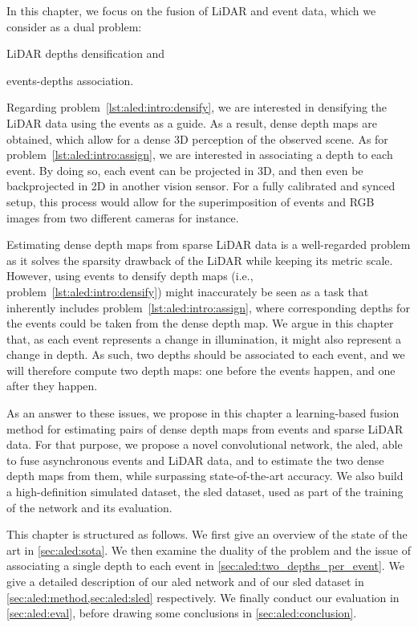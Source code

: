 In this chapter, we focus on the fusion of LiDAR and event data, which we consider as a dual problem:
\begin{enumerate*}[label=\textbf{(\arabic*)}]
  \item LiDAR depths densification and\label{lst:aled:intro:densify}
  \item events-depths association.\label{lst:aled:intro:assign}
\end{enumerate*}
Regarding problem~\ref{lst:aled:intro:densify}, we are interested in densifying the LiDAR data using the events as a guide. As a result, dense depth maps are obtained, which allow for a dense 3D perception of the observed scene. As for problem~\ref{lst:aled:intro:assign}, we are interested in associating a depth to each event. By doing so, each event can be projected in 3D, and then even be backprojected in 2D in another vision sensor. For a fully calibrated and synced setup, this process would allow for the superimposition of events and RGB images from two different cameras for instance.

Estimating dense depth maps from sparse LiDAR data is a well-regarded problem as it solves the sparsity drawback of the LiDAR while keeping its metric scale. However, using events to densify depth maps (i.e., problem~\ref{lst:aled:intro:densify}) might inaccurately be seen as a task that inherently includes problem~\ref{lst:aled:intro:assign}, where corresponding depths for the events could be taken from the dense depth map. We argue in this chapter that, as each event represents a change in illumination, it might also represent a change in depth. As such, two depths should be associated to each event, and we will therefore compute two depth maps: one before the events happen, and one after they happen.

As an answer to these issues, we propose in this chapter a learning-based fusion method for estimating pairs of dense depth maps from events and sparse LiDAR data. For that purpose, we propose a novel convolutional network, the \acrfull{aled}, able to fuse asynchronous events and LiDAR data, and to estimate the two dense depth maps from them, while surpassing state-of-the-art accuracy. We also build a high-definition simulated dataset, the \acrfull{sled} dataset, used as part of the training of the network and its evaluation.

This chapter is structured as follows. We first give an overview of the state of the art in \cref{sec:aled:sota}. We then examine the duality of the problem and the issue of associating a single depth to each event in \cref{sec:aled:two_depths_per_event}. We give a detailed description of our \acrshort{aled} network and of our \acrshort{sled} dataset in \cref{sec:aled:method,sec:aled:sled} respectively. We finally conduct our evaluation in \cref{sec:aled:eval}, before drawing some conclusions in \cref{sec:aled:conclusion}.


